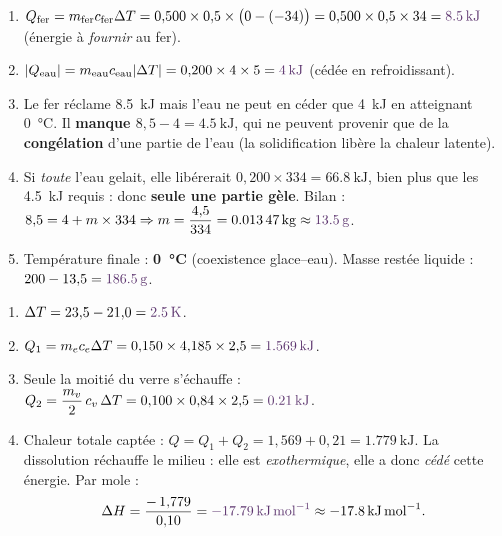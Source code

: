 \documentclass[11pt,a4paper]{article}
\newcommand{\rep}[1]{\textcolor{primarydark}{\textbf{#1}}}
\begin{document}
\begin{correction}
\begin{enumerate}[label=\alph*),leftmargin=2em,topsep=2pt,itemsep=2pt]
  \item $Q_{\text{fer}} = m_{\text{fer}}c_{\text{fer}}\Delta T = 0{,}500\times0{,}5\times\big(0-(-34)\big)
        = 0{,}500\times0{,}5\times34 = \rep{\SI{8.5}{\kilo\joule}}$ (énergie à \emph{fournir} au fer).
  \item $|Q_{\text{eau}}| = m_{\text{eau}}c_{\text{eau}}|\Delta T| = 0{,}200\times4\times5 = \rep{\SI{4}{\kilo\joule}}$ (cédée en refroidissant).
  \item Le fer réclame \SI{8.5}{\kilo\joule} mais l'eau ne peut en céder que \SI{4}{\kilo\joule} en
        atteignant \SI{0}{\celsius}. Il \rep{manque $8{,}5-4=\SI{4.5}{\kilo\joule}$}, qui ne peuvent
        provenir que de la \rep{congélation} d'une partie de l'eau (la solidification libère la chaleur latente).
  \item Si \emph{toute} l'eau gelait, elle libérerait $0{,}200\times334 = \SI{66.8}{\kilo\joule}$, bien
        plus que les \SI{4.5}{\kilo\joule} requis : donc \rep{seule une partie gèle}. Bilan :
        $8{,}5 = 4 + m\times334 \Rightarrow m = \dfrac{4{,}5}{334} = \SI{0.01347}{\kilogram} \approx \rep{\SI{13.5}{\gram}}$.
  \item Température finale : \rep{\SI{0}{\celsius}} (coexistence glace–eau). Masse restée liquide :
        $200 - 13{,}5 = \rep{\SI{186.5}{\gram}}$.
\end{enumerate}
\end{correction}

\begin{correction}
\begin{enumerate}[label=\alph*),leftmargin=2em,topsep=2pt,itemsep=2pt]
  \item $\Delta T = 23{,}5 - 21{,}0 = \rep{\SI{2.5}{\kelvin}}$.
  \item $Q_1 = m_e c_e \Delta T = 0{,}150\times4{,}185\times2{,}5 = \rep{\SI{1.569}{\kilo\joule}}$.
  \item Seule la moitié du verre s'échauffe : $Q_2 = \dfrac{m_v}{2}\,c_v\,\Delta T
        = 0{,}100\times0{,}84\times2{,}5 = \rep{\SI{0.21}{\kilo\joule}}$.
  \item Chaleur totale captée : $Q = Q_1 + Q_2 = 1{,}569 + 0{,}21 = \SI{1.779}{\kilo\joule}$. La dissolution
        réchauffe le milieu : elle est \emph{exothermique}, elle a donc \emph{cédé} cette énergie. Par mole :
        \[ \Delta H = \frac{-\,1{,}779}{0{,}10} = \rep{\SI{-17.79}{\kilo\joule\per\mol}} \approx \SI{-17.8}{\kilo\joule\per\mol}. \]
\end{enumerate}
\end{correction}
\end{document}
